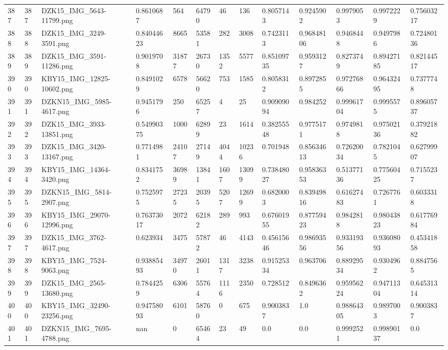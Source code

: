 \documentclass[11pt, a4paper, twoside]{report}
\begin{document}
\begin{longtable}[c]{@{}lllllllllllll@{}}
387 & 387 & DZK15\_IMG\_5643-11799.png & 0.8610687 & 564 & 64790 & 46 & 136 & 0.8057143 & 0.9245902 & 0.9979053 & 0.9972229 & 0.75603217 \\
388 & 388 & DZK15\_IMG\_3249-3591.png & 0.84044623 & 8665 & 53581 & 282 & 3008 & 0.7423113 & 0.96848106 & 0.9468448 & 0.9497986 & 0.72480136 \\
389 & 389 & DZK15\_IMG\_3591-11286.png & 0.9019708 & 31877 & 26730 & 1352 & 5577 & 0.85109735 & 0.9593127 & 0.8273749 & 0.89427185 & 0.82144517 \\
390 & 390 & KBY15\_IMG\_12825-10602.png & 0.8491029 & 6578 & 56620 & 753 & 1585 & 0.8058312 & 0.8972855 & 0.97276866 & 0.96432495 & 0.7377748 \\
391 & 391 & DZKN15\_IMG\_5985-4617.png & 0.9451796 & 250 & 65257 & 4 & 25 & 0.90909094 & 0.984252 & 0.99961704 & 0.9995575 & 0.89605737 \\
392 & 392 & DZK15\_IMG\_3933-13851.png & 0.54990375 & 1000 & 62899 & 23 & 1614 & 0.38255548 & 0.9775171 & 0.9749818 & 0.97502136 & 0.37921882 \\
393 & 393 & DZK15\_IMG\_3420-13167.png & 0.7714981 & 24107 & 27149 & 4044 & 10236 & 0.701948 & 0.85634613 & 0.72620034 & 0.7821045 & 0.62799907 \\
394 & 394 & KBY15\_IMG\_14364-3420.png & 0.8341752 & 36989 & 13841 & 1607 & 13099 & 0.73848027 & 0.95836353 & 0.51377136 & 0.77560425 & 0.7155237 \\
395 & 395 & DZKN15\_IMG\_5814-2907.png & 0.7525975 & 27235 & 20395 & 5207 & 12699 & 0.6820003 & 0.83949816 & 0.61627483 & 0.7267761 & 0.6033318 \\
396 & 396 & KBY15\_IMG\_29070-12996.png & 0.76373017 & 2072 & 62182 & 289 & 993 & 0.67601955 & 0.87759423 & 0.9842818 & 0.98043823 & 0.61776984 \\
397 & 397 & DZK15\_IMG\_3762-4617.png & 0.623934 & 3475 & 57872 & 46 & 4143 & 0.45615646 & 0.98693556 & 0.93319356 & 0.93608093 & 0.45341858 \\
398 & 398 & KBY15\_IMG\_7524-9063.png & 0.93885493 & 34970 & 26011 & 1317 & 3238 & 0.91525334 & 0.963706 & 0.88929534 & 0.9304962 & 0.8847565 \\
399 & 399 & DZK15\_IMG\_2565-13680.png & 0.7844259 & 6306 & 55764 & 1116 & 2350 & 0.728512 & 0.8496362 & 0.95956224 & 0.94711304 & 0.64531314 \\
400 & 400 & KBY15\_IMG\_32490-23256.png & 0.94758093 & 6101 & 58760 & 0 & 675 & 0.9003837 & 1.0 & 0.98864305 & 0.9897003 & 0.9003837 \\
401 & 401 & DZKN15\_IMG\_7695-4788.png & nan & 0 & 65464 & 23 & 49 & 0.0 & 0.0 & 0.9992521 & 0.99890137 & 0.0 \\

\end{longtable}
\end{document}
